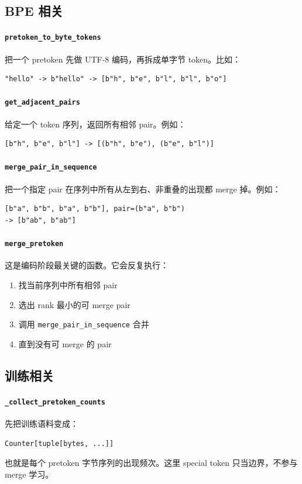 \documentclass[11pt,a4paper]{ctexart}
\begin{document}
\subsection{BPE 相关}
\paragraph{\texttt{pretoken\_to\_byte\_tokens}}
把一个 pretoken 先做 UTF-8 编码，再拆成单字节 token。比如：
\begin{lstlisting}
"hello" -> b"hello" -> [b"h", b"e", b"l", b"l", b"o"]
\end{lstlisting}

\paragraph{\texttt{get\_adjacent\_pairs}}
给定一个 token 序列，返回所有相邻 pair。例如：
\begin{lstlisting}
[b"h", b"e", b"l"] -> [(b"h", b"e"), (b"e", b"l")]
\end{lstlisting}

\paragraph{\texttt{merge\_pair\_in\_sequence}}
把一个指定 pair 在序列中所有从左到右、非重叠的出现都 merge 掉。例如：
\begin{lstlisting}
[b"a", b"b", b"a", b"b"], pair=(b"a", b"b")
-> [b"ab", b"ab"]
\end{lstlisting}

\paragraph{\texttt{merge\_pretoken}}
这是编码阶段最关键的函数。它会反复执行：
\begin{enumerate}[leftmargin=2em]
  \item 找当前序列中所有相邻 pair
  \item 选出 rank 最小的可 merge pair
  \item 调用 \texttt{merge\_pair\_in\_sequence} 合并
  \item 直到没有可 merge 的 pair
\end{enumerate}

\subsection{训练相关}
\paragraph{\texttt{\_collect\_pretoken\_counts}}
先把训练语料变成：
\begin{lstlisting}
Counter[tuple[bytes, ...]]
\end{lstlisting}
也就是每个 pretoken 字节序列的出现频次。这里 special token 只当边界，不参与 merge 学习。
\end{document}
